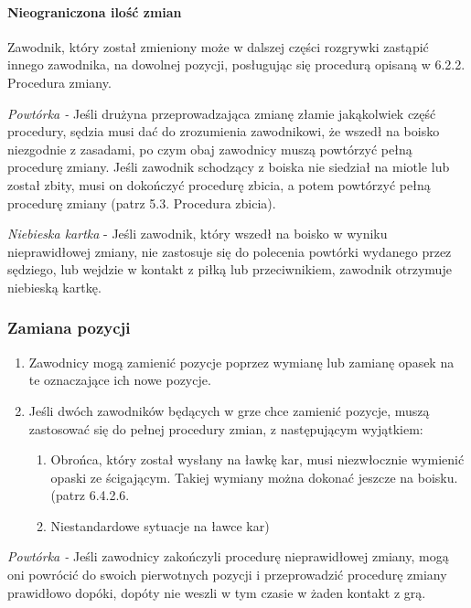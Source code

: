 \documentclass[12pt]{article}
\begin{document}
\paragraph{Nieograniczona ilość zmian}
Zawodnik, który został
zmieniony może w dalszej części rozgrywki zastąpić innego zawodnika, na
dowolnej pozycji, posługując się procedurą opisaną w 6.2.2. Procedura
zmiany.

\emph{Powtórka -} Jeśli drużyna przeprowadzająca zmianę złamie
jakąkolwiek część procedury, sędzia musi dać do zrozumienia zawodnikowi,
że wszedł na boisko niezgodnie z zasadami, po czym obaj zawodnicy muszą
powtórzyć pełną procedurę zmiany. Jeśli zawodnik schodzący z boiska nie
siedział na miotle lub został zbity, musi on dokończyć procedurę zbicia,
a potem powtórzyć pełną procedurę zmiany (patrz 5.3. Procedura zbicia).

\emph{Niebieska kartka} - Jeśli zawodnik, który wszedł na boisko w
wyniku nieprawidłowej zmiany, nie zastosuje się do polecenia powtórki
wydanego przez sędziego, lub wejdzie w kontakt z piłką lub
przeciwnikiem, zawodnik otrzymuje niebieską kartkę.

\subsubsection{Zamiana pozycji}

\begin{enumerate}
	\item
	      Zawodnicy mogą zamienić pozycje poprzez wymianę lub zamianę opasek na
	      te oznaczające ich nowe pozycje.
	\item
	      Jeśli dwóch zawodników będących w grze chce zamienić pozycje, muszą
	      zastosować się do pełnej procedury zmian, z następującym wyjątkiem:

	      \begin{enumerate}
		      \item
		            Obrońca, który został wysłany na ławkę kar, musi niezwłocznie
		            wymienić opaski ze ścigającym. Takiej wymiany można dokonać jeszcze
		            na boisku. (patrz 6.4.2.6.\item Niestandardowe sytuacje na ławce kar)
	      \end{enumerate}
\end{enumerate}

\emph{Powtórka -} Jeśli zawodnicy zakończyli procedurę nieprawidłowej
zmiany, mogą oni powrócić do swoich pierwotnych pozycji i przeprowadzić
procedurę zmiany prawidłowo dopóki, dopóty nie weszli w
tym czasie w żaden kontakt z grą.
\end{document}
